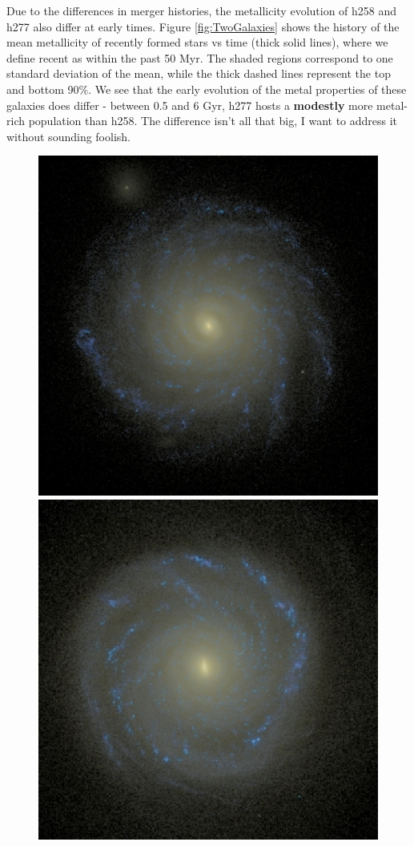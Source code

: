 \documentclass[nofootinbib,twocolumn,prd]{emulateapj}
\newcommand\editremark[1]{{\color{red}#1}}
\begin{document}
  Due to the differences in merger histories, the metallicity
  evolution of h258 and h277 also differ at early times.  Figure
  \ref{fig:TwoGalaxies} shows the history of the mean metallicity of
  recently formed stars vs time (thick solid lines), where we define
  recent as within the past 50 Myr.  The shaded regions correspond to
  one standard deviation of the mean, while the thick dashed lines
  represent the top and bottom 90\%.  We see that the early evolution
  of the metal properties of these galaxies does differ - between 0.5
  and 6 Gyr, h277 hosts a {\bf modestly} more metal-rich population than
  h258. \editremark{The difference isn't all that big, I want to address it without sounding foolish.}


\begin{figure}
\includegraphics[width=\columnwidth]{Figures/boring}
\includegraphics[width=\columnwidth]{Figures/exciting}

\end{figure}
\end{document}
